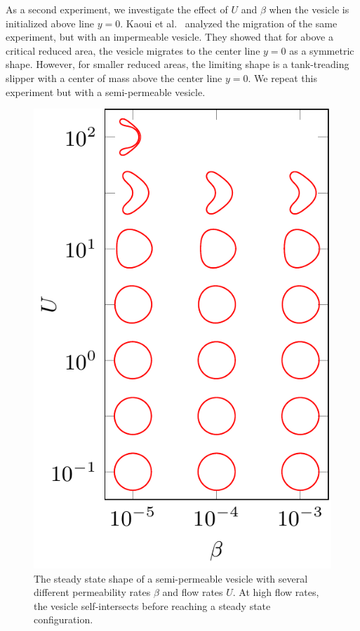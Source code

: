 \documentclass[9pt,twocolumn,twoside,lineno]{pnas-new}
\newif\ifTikz
\begin{document}
As a second experiment, we investigate the effect of $U$ and $\beta$
when the vesicle is initialized above line $y=0$. Kaoui et
al.~\cite{kao-bir-mis2009} analyzed the migration of the same
experiment, but with an impermeable vesicle. They showed that for
above a critical reduced area, the vesicle migrates to the center line
$y=0$ as a symmetric shape. However, for smaller reduced areas, the
limiting shape is a tank-treading slipper with a center of mass above
the center line $y=0$. We repeat this experiment but with a
semi-permeable vesicle.


\begin{figure}[htp]
%  
  \includegraphics[width=0.8\linewidth]{figures/parabolicPhaseDiagram.pdf}
  \caption{\label{fig:parabolicPhaseDiagram} The steady state shape of a
  semi-permeable vesicle with several different permeability rates
  $\beta$ and flow rates $U$. At high flow rates, the vesicle
  self-intersects before reaching a steady state configuration.}
\end{figure}
\end{document}
